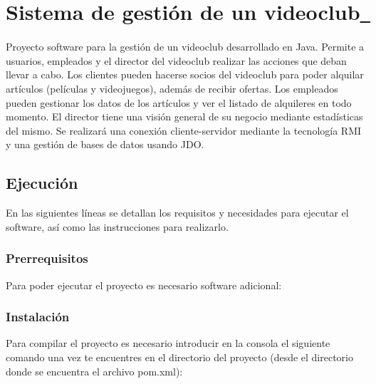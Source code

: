 \section*{Sistema de gestión de un videoclub \href{https://travis-ci.com/BSPQ18-19/BSPQ19-S1}{\texttt{ }}}

Proyecto software para la gestión de un videoclub desarrollado en Java. Permite a usuarios, empleados y el director del videoclub realizar las acciones que deban llevar a cabo. Los clientes pueden hacerse socios del videoclub para poder alquilar artículos (películas y videojuegos), además de recibir ofertas. Los empleados pueden gestionar los datos de los artículos y ver el listado de alquileres en todo momento. El director tiene una visión general de su negocio mediante estadísticas del mismo. Se realizará una conexión cliente-\/servidor mediante la tecnología R\+MI y una gestión de bases de datos usando J\+DO.

\subsection*{Ejecución}

En las siguientes líneas se detallan los requisitos y necesidades para ejecutar el software, así como las instrucciones para realizarlo.

\subsubsection*{Prerrequisitos}

Para poder ejecutar el proyecto es necesario software adicional\+:


\begin{DoxyCode}{0}
\end{DoxyCode}


\subsubsection*{Instalación}

Para compilar el proyecto es necesario introducir en la consola el siguiente comando una vez te encuentres en el directorio del proyecto (desde el directorio donde se encuentra el archivo pom.\+xml)\+:


\begin{DoxyCode}{0}
\end{DoxyCode}


